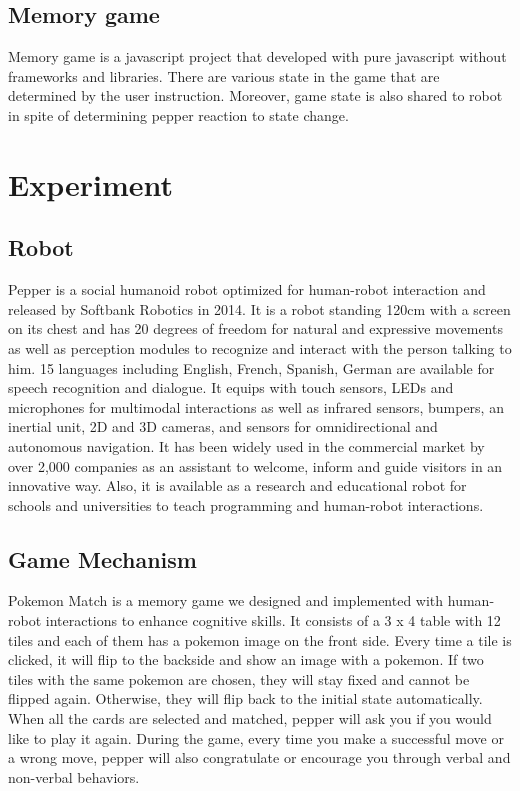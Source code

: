 \documentclass[12pt]{article}
\begin{document}
\subsection{Memory game}
Memory game is a javascript project that developed with pure javascript without frameworks and libraries. There are various state in the game that are determined by the user instruction. Moreover, game state is also shared to robot in spite of determining pepper reaction to state change.
\section{Experiment}

\subsection{Robot}
Pepper is a social humanoid robot optimized for human-robot interaction and released by Softbank Robotics in 2014. It is a robot standing 120cm with a screen on its chest and has 20 degrees of freedom for natural and expressive movements as well as perception modules to recognize and interact with the person talking to him. 15 languages including English, French, Spanish, German are available  for speech recognition and dialogue. It equips with touch sensors, LEDs and microphones for multimodal interactions as well as infrared sensors, bumpers, an inertial unit, 2D and 3D cameras, and sensors for omnidirectional and autonomous navigation. It has been widely used in the commercial market by over 2,000 companies as an assistant to welcome, inform and guide visitors in an innovative way. Also, it is available as a research and educational robot for schools and universities to teach programming and human-robot interactions. 

\subsection{Game Mechanism}
Pokemon Match is a memory game we designed and implemented with human-robot interactions to enhance cognitive skills. It consists of a 3 x 4 table with 12 tiles and each of them has a pokemon image on the front side. Every time a tile is clicked, it will flip to the backside and show an image with a pokemon. If two tiles with the same pokemon are chosen, they will stay fixed and cannot be flipped again. Otherwise, they will flip back to the initial state automatically. When all the cards are selected and matched, pepper will ask you if you would like to play it again. During the game, every time you make a successful move or a wrong move, pepper will also congratulate or encourage you through verbal and non-verbal behaviors.
\end{document}
